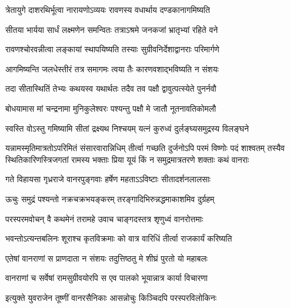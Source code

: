 \twolineshloka
{त्रेतायुगे दाशरथिर्भूत्वा नारायणोऽव्ययः}
{रावणस्य वधार्थाय दण्डकानागमिष्यति} %

\twolineshloka
{सीतया भार्यया सार्धं लक्ष्मणेन समन्वितः}
{तत्राऽश्रमे जनकजां भ्रातृभ्यां रहिते वने} %

\twolineshloka
{रावणश्चोरवन्नीत्वा लङ्कायां स्थापयिष्यति}
{तस्याः सुग्रीवनिर्देशाद्वानराः परिमार्गणे} %

\twolineshloka
{आगमिष्यन्ति जलधेस्तीरं तत्र समागमः}
{त्वया तैः कारणवशाद्भविष्यति न संशयः} %

\twolineshloka
{तदा सीतास्थितिं तेभ्यः कथयस्व यथार्थतः}
{तदैव तव पक्षौ द्वावुत्पत्स्येते पुनर्नवौ} %


\twolineshloka
{बोधयामास मां चन्द्रनामा मुनिकुलेश्वरः}
{पश्यन्तु पक्षौ मे जातौ नूतनावतिकोमलौ} %

\twolineshloka
{स्वस्ति वोऽस्तु गमिष्यामि सीतां द्रक्ष्यथ निश्चयम्}
{यत्नं कुरुध्वं दुर्लङ्घ्यसमुद्रस्य विलङ्घने} %

\fourlineindentedshloka
{यन्नामस्मृतिमात्रतोऽपरिमितं संसारवारान्निधिम्}
{तीर्त्वा गच्छति दुर्जनोऽपि परमं विष्णोः पदं शाश्वतम्}
{तस्यैव स्थितिकारिणस्त्रिजगतां रामस्य भक्ताः प्रिया}
{यूयं किं न समुद्रमात्रतरणे शक्ताः कथं वानराः} %






\twolineshloka
{गते विहायसा गृध्रराजे वानरपुङ्गवाः}
{हर्षेण महताऽऽविष्टाः सीतादर्शनलालसाः} %

\twolineshloka
{ऊचुः समुद्रं पश्यन्तो नक्रचक्रभयङ्करम्}
{तरङ्गादिभिरुन्नद्धमाकाशमिव दुर्ग्रहम्} %

\twolineshloka
{परस्परमवोचन् वै कथमेनं तरामहे}
{उवाच चाङ्गदस्तत्र शृणुध्वं वानरोत्तमाः} %

\twolineshloka
{भवन्तोऽत्यन्तबलिनः शूराश्च कृतविक्रमाः}
{को वात्र वारिधिं तीर्त्वा राजकार्यं करिष्यति} %

\twolineshloka
{एतेषां वानराणां स प्राणदाता न संशयः}
{तदुत्तिष्ठतु मे शीघ्रं पुरतो यो महाबलः} %

\twolineshloka
{वानराणां च सर्वेषां रामसुग्रीवयोरपि}
{स एव पालको भूयान्नात्र कार्या विचारणा} %

\twolineshloka
{इत्युक्ते युवराजेन तूष्णीं वानरसैनिकाः}
{आसन्नोचुः किञ्चिदपि परस्परविलोकिनः} %


